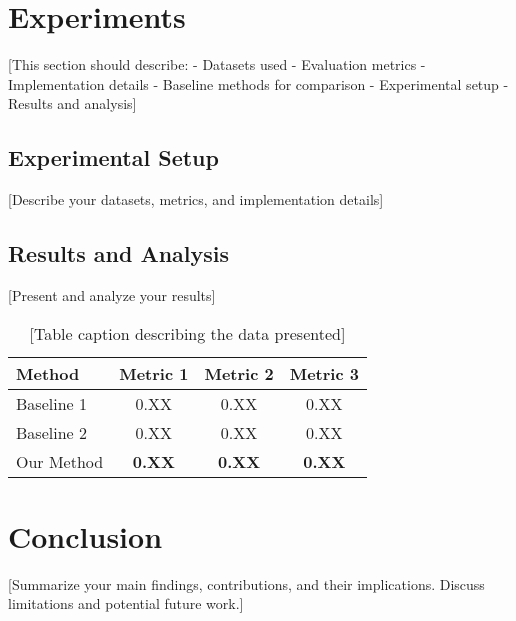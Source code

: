 \documentclass[conference]{IEEEtran}
\begin{document}
\section{Experiments}
[This section should describe:
- Datasets used
- Evaluation metrics
- Implementation details
- Baseline methods for comparison
- Experimental setup
- Results and analysis]

\subsection{Experimental Setup}
[Describe your datasets, metrics, and implementation details]

\subsection{Results and Analysis}
[Present and analyze your results]

\begin{table}[t]
\centering
\caption{[Table caption describing the data presented]}
\label{tab:results}
\begin{tabular}{lccc}
\toprule
\textbf{Method} & \textbf{Metric 1} & \textbf{Metric 2} & \textbf{Metric 3} \\
\midrule
Baseline 1 & 0.XX & 0.XX & 0.XX \\
Baseline 2 & 0.XX & 0.XX & 0.XX \\
Our Method & \textbf{0.XX} & \textbf{0.XX} & \textbf{0.XX} \\
\bottomrule
\end{tabular}
\end{table}

\section{Conclusion}
[Summarize your main findings, contributions, and their implications. Discuss limitations and potential future work.]

  
\end{document}

